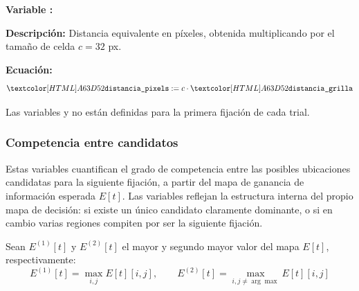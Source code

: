 \begin{featuredef}
\textbf{Variable \thetcbcounter:} 

\textbf{Descripción:} Distancia equivalente en píxeles, obtenida
multiplicando por el tamaño de celda $c = 32$ px.

\textbf{Ecuación:}
\begin{equation}
    \feat{distancia\_pixels} := c \cdot \feat{distancia\_grilla}
\end{equation}
\end{featuredef}

Las variables  y 
no están definidas para la primera fijación de cada trial.

\subsubsection{Competencia entre candidatos}

Estas variables cuantifican el grado de competencia entre las posibles
ubicaciones candidatas para la siguiente fijación, a partir del mapa de
ganancia de información esperada $E[t]$. Las variables reflejan la
estructura interna del propio mapa de decisión: si existe un único candidato
claramente dominante, o si en cambio varias regiones compiten por ser la
siguiente fijación.

Sean $E^{(1)}[t]$ y $E^{(2)}[t]$ el mayor y segundo mayor valor
del mapa $E[t]$, respectivamente:
\begin{equation}
    E^{(1)}[t] = \max_{i,j} E[t][i,j], \qquad
    E^{(2)}[t] = \max_{i,j \neq \arg\max} E[t][i,j]
\end{equation}



